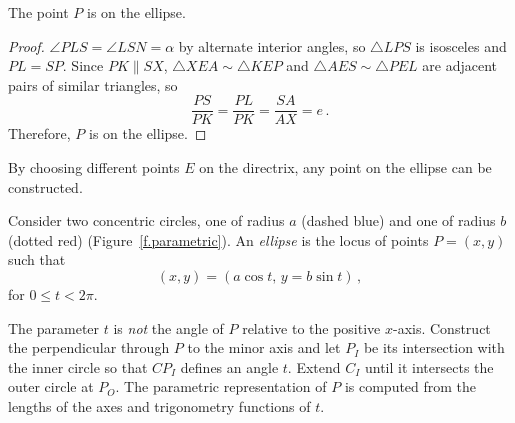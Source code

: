 \begin{theorem}\label{thm.point-on-an-ellipse}
The point $P$ is on the ellipse.
\end{theorem}
\begin{proof}
$\angle PLS = \angle LSN=\alpha$ by alternate interior angles, so $\triangle LPS$ is isosceles and $PL=SP$. Since $PK\parallel SX$, $\triangle XEA\sim \triangle KEP$ and $\triangle AES\sim \triangle PEL$ are adjacent pairs of similar triangles, so
\[
\frac{PS}{PK}=\frac{PL}{PK}=\frac{SA}{AX}=e\,.
\]
Therefore, $P$ is on the ellipse.\hqed
\end{proof}

By choosing different points $E$ on the directrix, any point on the ellipse can be constructed.


\begin{definition}
Consider two concentric circles, one of radius $a$ (dashed blue) and one of radius $b$ (dotted red) (Figure~\ref{f.parametric}). An \emph{ellipse} is the locus of points $P=(x,y)$ such that
\[
(x,y)= (a\cos t,\, y = b \sin t)\,,
\]
for $0\le t < 2\pi$.
\end{definition}
The parameter $t$ is \emph{not} the angle of $P$ relative to the positive $x$-axis. Construct the perpendicular through $P$ to the minor axis and let $P_I$ be its intersection with the inner circle so that $CP_I$ defines an angle $t$.  Extend $C_I$ until it intersects the outer circle at $P_O$. The parametric representation of $P$ is computed from the lengths of the axes and trigonometry functions of $t$.


